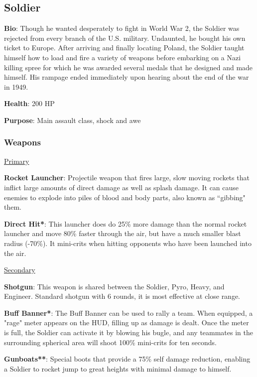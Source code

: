 \subsection{Soldier}
\label{Soldier}
{\bf Bio}:
Though he wanted desperately to fight in World War 2, the Soldier was rejected from every branch of the U.S. military. Undaunted, he bought his own ticket to Europe. After arriving and finally locating Poland, the Soldier taught himself how to load and fire a variety of weapons before embarking on a Nazi killing spree for which he was awarded several medals that he designed and made himself. His rampage ended immediately upon hearing about the end of the war in 1949.

{\bf Health}: 200 HP

{\bf Purpose}:
Main assault class, shock and awe

\subsubsection {Weapons}

\begin {center}
\underline {Primary}
\end {center}

{\bf Rocket Launcher}: Projectile weapon that fires large, slow moving rockets that inflict large amounts of direct damage as well as splash damage. It can cause enemies to explode into piles of blood and body parts, also known as ``gibbing" them.

{\bf Direct Hit*}: This launcher does do 25\% more damage than the normal rocket launcher and move 80\% faster through the air, but have a much smaller blast radius (-70\%). It mini-crits when hitting opponents who have been launched into the air.

\begin {center}
\underline {Secondary}
\end {center}

{\bf Shotgun}: This weapon is shared between the Soldier, Pyro, Heavy, and Engineer. Standard shotgun with 6 rounds, it is most effective at close range. 

{\bf Buff Banner*}: The Buff Banner can be used to rally a team.  When equipped, a "rage" meter appears on the HUD, filling up as damage is dealt.  Once the meter is full, the Soldier can activate it by blowing his bugle, and any teammates in the surrounding spherical area will shoot 100\% mini-crits for ten seconds.

{\bf Gunboats**}: Special boots that provide a 75\% self damage reduction, enabling a Soldier to rocket jump to great heights with minimal damage to himself.

